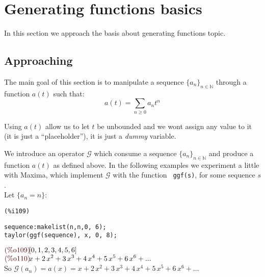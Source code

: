 \section{Generating functions basics}

In this section we approach the basis about generating functions topic.

\subsection{Approaching}

The main goal of this section is to manipulate a sequence $\{a_n\}_{n\in
  \mathbb{N} }$ through a function $a(t)$ such that:
\begin{displaymath}
  a(t) = \sum_{n \geq 0}{a_n t^n}
\end{displaymath}

Using $a(t)$ allow us to let $t$ be unbounded and we wont assign any
value to it (it is just a ``placeholder''), it is just a \emph{dummy} variable.

We introduce an operator $\mathcal{G}$ which consume a sequence
$\{a_n\}_{n\in \mathbb{N} }$ and produce a function $a(t)$ as defined
above. In the following examples we experiment a little with Maxima,
which implement $\mathcal{G}$ with the function
\texttt{\color{blue} ggf(s)}, for some sequence $s$.\\

Let $\{a_n = n\}$:\\
\noindent
\begin{minipage}[t]{8ex}{\color{red}\bf
\begin{verbatim}
(%i109)
\end{verbatim}}
\end{minipage}
\begin{minipage}[t]{\textwidth}{\color{blue}
\begin{verbatim}
sequence:makelist(n,n,0, 6);
taylor(ggf(sequence), x, 0, 8);
\end{verbatim}}
\end{minipage}
\begin{math}\displaystyle
\parbox{8ex}{\color{labelcolor}(\%o109) }
[0,1,2,3,4,5,6]
\end{math}\\
\begin{math}\displaystyle
\parbox{8ex}{\color{labelcolor}(\%o110) }
x+2\,{x}^{2}+3\,{x}^{3}+4\,{x}^{4}+5\,{x}^{5}+6\,{x}^{6}+...
\end{math}\\
So $\mathcal{G}(a_n) = a(x)=
x+2\,{x}^{2}+3\,{x}^{3}+4\,{x}^{4}+5\,{x}^{5}+6\,{x}^{6}+...$\\

